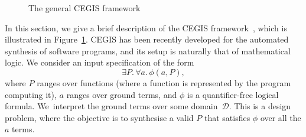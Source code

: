 \begin{figure}
\centering
{}
 \caption{The general CEGIS framework\label{fig:CEGIS}}
\end{figure}

In this section, we give a brief description of the CEGIS framework~\cite{jha-icse10,
  DBLP:conf/asplos/Solar-LezamaTBSS06}, which is illustrated in Figure~\ref{fig:CEGIS}. 
  CEGIS has been recently developed for the automated synthesis of software programs, 
  and its setup is naturally that of mathematical logic. We consider an input specification of the form 
$$
\exists P .\, \forall a.\, \phi(a, P),
$$  
where $P$ ranges over functions (where a function is represented by the program computing it),
$a$ ranges over ground terms, 
and $\phi$ is a quantifier-free logical formula. 
We~interpret the ground terms over some domain~$\mathcal{D}$. 
This is a design problem, where the objective is to synthesise a valid $P$ that satisfies $\phi$ over all the $a$ terms. 

